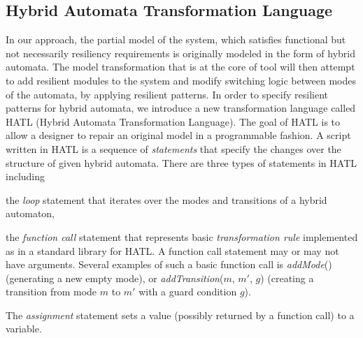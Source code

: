 \subsection{Hybrid Automata Transformation Language}
In our approach, the partial model of the system, which satisfies functional but not necessarily resiliency requirements is originally modeled in the form of hybrid automata. The model transformation that is at the core of \toolreaffirm tool will then attempt to add resilient modules to the system and modify switching logic between modes of the automata, by applying resilient patterns. 
%
%
%
In order to specify resilient patterns for hybrid automata, we introduce a new transformation language called HATL (Hybrid Automata Transformation Language). The goal of HATL is to allow a designer to repair an original model in a programmable fashion. A script written in HATL is a sequence of \emph{statements} that specify the changes over the structure of given hybrid automata. There are three types of statements in HATL including
\begin{inparaenum}[(a)]
\item the \emph{loop} statement that iterates over the modes and transitions of a hybrid automaton,
\item the \emph{function call} statement that represents basic \emph{transformation rule} implemented as in a standard library for HATL. A function call statement may or may not have arguments. Several examples of such a basic function call is \emph{addMode}() (\ie generating a new empty mode), or \emph{addTransition}($m$, $m'$, $g$) (\ie creating a transition from mode $m$ to $m'$ with a guard condition $g$).
\item The \emph{assignment} statement sets a value (possibly returned by a function call) to a variable.
\end{inparaenum}
%

%


